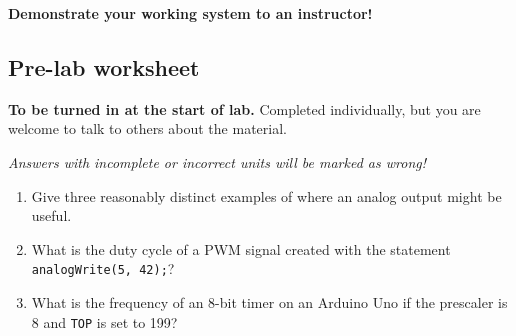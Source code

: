 \documentclass[11pt]{article} %
\begin{document}
{\bf Demonstrate your working system to an instructor!}

\clearpage

\subsection{Pre-lab worksheet}
\label{sec:prelab}

{\bf To be turned in at the start of lab.} Completed individually, but you are welcome to talk to others about the material.

\emph{Answers with incomplete or incorrect units will be marked as wrong!}

\begin{enumerate}
\item Give three reasonably distinct examples of where an analog output might be useful.
\vspace{1in}
\item What is the duty cycle of a PWM signal created with the statement \verb|analogWrite(5, 42);|?
\vspace{1in}
\item What is the frequency of an 8-bit timer on an Arduino Uno if the prescaler is 8 and \verb|TOP| is set to 199?
\vspace{1in}
\end{enumerate}
\end{document}
